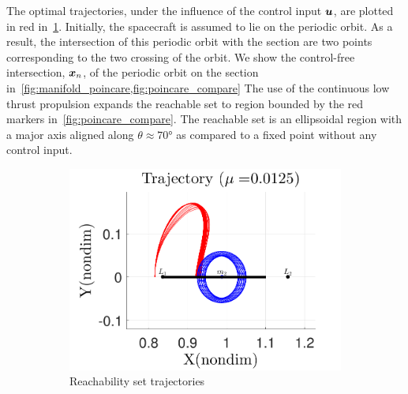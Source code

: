 \documentclass[smallcondensed]{svjour3}
\begin{document}
The optimal trajectories, under the influence of the control input \( \bm{u} \), are plotted in red in~\cref{fig:reach_trajectory}.
Initially, the spacecraft is assumed to lie on the periodic orbit.
As a result, the intersection of this periodic orbit with the \Poincare section are two points corresponding to the two crossing of the orbit.
We show the control-free intersection, \( \bm{x}_n \), of the periodic orbit on the \Poincare section in~\cref{fig:manifold_poincare,fig:poincare_compare}
The use of the continuous low thrust propulsion expands the reachable set to region bounded by the red markers in~\cref{fig:poincare_compare}.
The reachable set is an ellipsoidal region with a major axis aligned along \( \theta \approx \ang{70} \) as compared to a fixed point without any control input.
\begin{figure} 
        \centering 
        \begin{subfigure}[htbp]{0.5\textwidth} 
                \includegraphics[width=\textwidth]{reach_trajectory} 
                \caption{Reachability set trajectories} \label{fig:reach_trajectory} 
        \end{subfigure}~ %
        \begin{subfigure}[htbp]{0.5\textwidth} 

\end{subfigure}
\end{figure}
\end{document}
